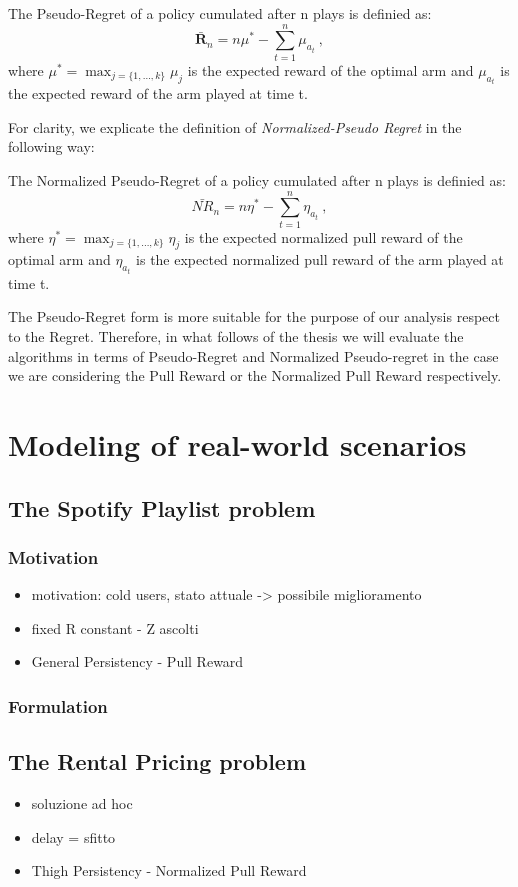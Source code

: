 \begin{definition}
	The Pseudo-Regret of a policy cumulated after n plays is definied as:
		$$\bm\bar{R}_{n}=n{\mu^{*}}- \sum_{t=1}^{n} \mu_{a_t} \ ,$$
	where  $\mu^{*}=\max_{j = \{1,\dots,k\}} \mu_j$ is the expected reward of the optimal arm and $\mu_{a_t}$ is the expected reward of the arm played at time t.
\end{definition}
For clarity, we explicate the definition of \emph{Normalized-Pseudo Regret} in the following way:
\begin{definition}
	The Normalized Pseudo-Regret of a policy cumulated after n plays is definied as:
	$$\bm\bar{\mathit{NR}}_{n}=n{\eta^{*}}- \sum_{t=1}^{n} \eta_{a_t} \ , $$
	where  $\eta^{*}=\max_{j = \{1,\dots,k\}} \eta_j$ is the expected normalized pull reward of the optimal arm and $\eta_{a_t}$ is the expected normalized pull reward of the arm played at time t.
\end{definition}



The Pseudo-Regret form is more suitable for the purpose of our analysis respect to the Regret. Therefore, in what follows of the thesis we will evaluate the algorithms in terms of Pseudo-Regret and Normalized Pseudo-regret in the case we are considering the Pull Reward or the Normalized Pull Reward respectively.



\section{Modeling of real-world scenarios}
\subsection{The Spotify Playlist problem}
\subsubsection*{Motivation}
\begin{itemize}
	

	\item motivation: cold users, stato attuale -> possibile miglioramento 
	
	
	\item fixed R constant - Z ascolti 
	\item General Persistency - Pull Reward
\end{itemize}
\subsubsection*{Formulation}
\subsection{The Rental Pricing problem}
\begin{itemize}
	\item soluzione ad hoc
	\item delay = sfitto 
	\item Thigh Persistency - Normalized Pull Reward
\end{itemize}
 	





